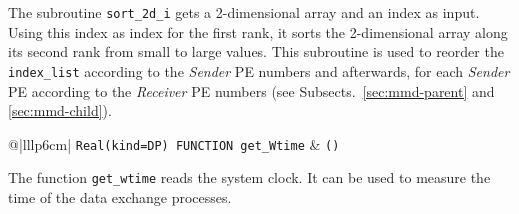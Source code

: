 \documentclass[twoside]{article}
\begin{document}
The subroutine \verb|sort_2d_i| gets a 2-dimensional array  and an
index as input. Using this index as index for the first rank, it sorts the 
2-dimensional array along its second rank from small to large values. This 
subroutine is used to reorder the \verb|index_list| according to the
{\it Sender} PE
numbers and afterwards, for each {\it Sender} PE according to the {\it
Receiver} PE numbers (see Subsects.\ \ref{sec:mmd-parent} and \ref{sec:mmd-child}).\\

\begin{tabular*}{\textwidth}{@{\extracolsep\fill}|lllp{6cm}|}
\hline
{}
{\tt Real(kind=DP) FUNCTION get\_Wtime} &
{\tt ()}\\
\hline
\end{tabular*}
\smallskip

The function \verb|get_wtime| reads the system clock.
It can be used to measure the time of the data exchange processes. 
\end{document}
